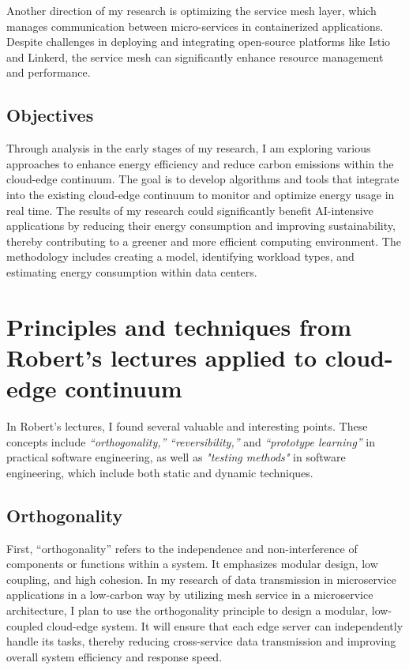 \documentclass[11pt]{report}
\begin{document}
Another direction of my research is optimizing the service mesh layer, which manages communication between micro-services in containerized applications. Despite challenges in deploying and integrating open-source platforms like Istio and Linkerd, the service mesh can significantly enhance resource management and performance.  

\section{Objectives}
\label{sec:objectives}
Through analysis in the early stages of my research, I am exploring various approaches to enhance energy efficiency and reduce carbon emissions within the cloud-edge continuum. The goal is to develop algorithms and tools that integrate into the existing cloud-edge continuum to monitor and optimize energy usage in real time. The results of my research could significantly benefit AI-intensive applications by reducing their energy consumption and improving sustainability, thereby contributing to a greener and more efficient computing environment. The methodology includes creating a model, identifying workload types, and estimating energy consumption within data centers.

\chapter{Principles and techniques from Robert's lectures applied to cloud-edge continuum}\label{chap:robert}

In Robert's lectures, I found several valuable and interesting points. These concepts include \textit{``orthogonality,''} \textit{``reversibility,''} and \textit{``prototype learning''} in practical software engineering, as well as \textit{"testing methods"} in software engineering, which include both static and dynamic techniques.
\section{Orthogonality}
\label{sec:orthogonality}
First, ``orthogonality'' refers to the independence and non-interference of components or functions within a system. It emphasizes modular design, low coupling, and high cohesion. In my research of data transmission in microservice applications in a low-carbon way by utilizing mesh service in a microservice architecture, I plan to use the orthogonality principle to design a modular, low-coupled cloud-edge system. It will ensure that each edge server can independently handle its tasks, thereby reducing cross-service data transmission and improving overall system efficiency and response speed.
\end{document}
